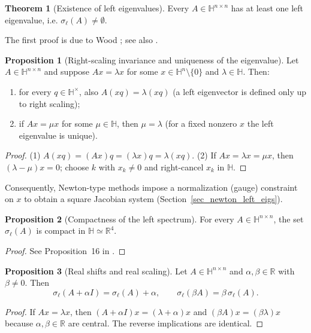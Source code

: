 \documentclass[preprint,12pt]{elsarticle}  %
\theoremstyle{definition}
\theoremstyle{definition}
\newtheorem{The}{Theorem}
\theoremstyle{definition}
\theoremstyle{definition}
\theoremstyle{definition}
\newtheorem{Pro}{Proposition}
\theoremstyle{remark}
\theoremstyle{remark}
\theoremstyle{remark}
\newcommand{\RR}{\mathbb{R}}
\newcommand{\HH}{\mathbb{H}}
\begin{document}
\begin{The}[Existence of left eigenvalues]
\label{th_wood_existence}
Every $A\in\HH^{n\times n}$ has at least one left eigenvalue, i.e. $\sigma_\ell(A)\neq\emptyset$.
\end{The}
The first proof is due to Wood \cite{Wood1985}; see also \cite{MaciasVirgosPereiraSaez2014}.

\begin{Pro}[Right-scaling invariance and uniqueness of the eigenvalue]
\label{pro_gauge_freedom}
Let $A\in\HH^{n\times n}$ and suppose $Ax=\lambda x$ for some $x\in\HH^n\setminus\{0\}$ and $\lambda\in\HH$.
Then:
\begin{enumerate}
\item for every $q\in\HH^\times$, also $A(xq)=\lambda(xq)$ (a left eigenvector is defined only up to right scaling);
\item if $Ax=\mu x$ for some $\mu\in\HH$, then $\mu=\lambda$ (for a fixed nonzero $x$ the left eigenvalue is unique).
\end{enumerate}
\end{Pro}
\begin{proof}
(1) $A(xq)=(Ax)q=(\lambda x)q=\lambda(xq)$.
(2) If $Ax=\lambda x=\mu x$, then $(\lambda-\mu)x=0$; choose $k$ with $x_k\neq 0$ and right-cancel $x_k$ in $\HH$.
\end{proof}
Consequently, Newton-type methods impose a normalization (gauge) constraint on $x$ to obtain a square Jacobian system (Section~\ref{sec_newton_left_eigs}).

\begin{Pro}[Compactness of the left spectrum]
\label{pro_left_spectrum_compact}
For every $A\in\HH^{n\times n}$, the set $\sigma_\ell(A)$ is compact in $\HH\simeq\RR^4$.
\end{Pro}

\begin{proof}
See Proposition~16 in \cite{MaciasVirgosPereiraSaez2014}.
\end{proof}

\begin{Pro}[Real shifts and real scaling]
\label{pro_left_real_shift_scale}
Let $A\in\HH^{n\times n}$ and $\alpha,\beta\in\RR$ with $\beta\neq 0$.
Then
\[
\sigma_\ell(A+\alpha I)=\sigma_\ell(A)+\alpha,
\qquad
\sigma_\ell(\beta A)=\beta\,\sigma_\ell(A).
\]
\end{Pro}
\begin{proof}
If $Ax=\lambda x$, then $(A+\alpha I)x=(\lambda+\alpha)x$ and $(\beta A)x=(\beta\lambda)x$ because $\alpha,\beta\in\RR$ are central.
The reverse implications are identical.
\end{proof}
\end{document}
